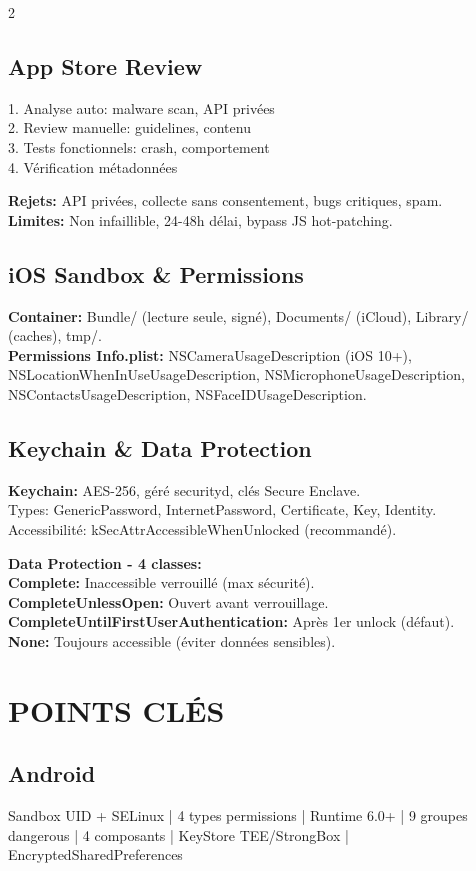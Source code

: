 \documentclass[9pt,a4paper]{extarticle}
\begin{document}
\begin{multicols}{2}
\subsection*{App Store Review}
1. Analyse auto: malware scan, API privées\\
2. Review manuelle: guidelines, contenu\\
3. Tests fonctionnels: crash, comportement\\
4. Vérification métadonnées

\textbf{Rejets:} API privées, collecte sans consentement, bugs critiques, spam.\\
\textbf{Limites:} Non infaillible, 24-48h délai, bypass JS hot-patching.

\subsection*{iOS Sandbox \& Permissions}
\textbf{Container:} Bundle/ (lecture seule, signé), Documents/ (iCloud), Library/ (caches), tmp/.\\
\textbf{Permissions Info.plist:} NSCameraUsageDescription (iOS 10+), NSLocationWhenInUseUsageDescription, NSMicrophoneUsageDescription, NSContactsUsageDescription, NSFaceIDUsageDescription.

\subsection*{Keychain \& Data Protection}
\textbf{Keychain:} AES-256, géré securityd, clés Secure Enclave.\\
Types: GenericPassword, InternetPassword, Certificate, Key, Identity.\\
Accessibilité: kSecAttrAccessibleWhenUnlocked (recommandé).

\textbf{Data Protection - 4 classes:}\\
\textbf{Complete:} Inaccessible verrouillé (max sécurité).\\
\textbf{CompleteUnlessOpen:} Ouvert avant verrouillage.\\
\textbf{CompleteUntilFirstUserAuthentication:} Après 1er unlock (défaut).\\
\textbf{None:} Toujours accessible (éviter données sensibles).

\section*{POINTS CLÉS}

\subsection*{Android}
Sandbox UID + SELinux | 4 types permissions | Runtime 6.0+ | 9 groupes dangerous | 4 composants | KeyStore TEE/StrongBox | EncryptedSharedPreferences


\end{multicols}
\end{document}
